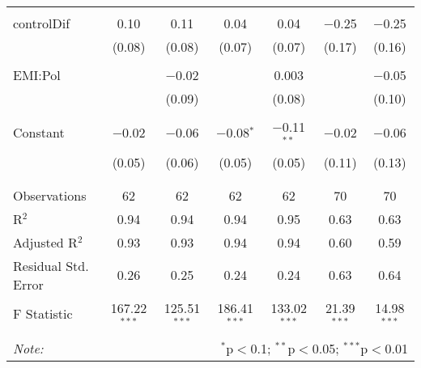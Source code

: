 \begin{table}[!htbp]
\begin{tabular}{@{\extracolsep{5pt}}lcccccc}
  & & & & & & \\ 
 controlDif & 0.10 & 0.11 & 0.04 & 0.04 & $-$0.25 & $-$0.25 \\ 
  & (0.08) & (0.08) & (0.07) & (0.07) & (0.17) & (0.16) \\ 
  & & & & & & \\ 
 EMI:Pol &  & $-$0.02 &  & 0.003 &  & $-$0.05 \\ 
  &  & (0.09) &  & (0.08) &  & (0.10) \\ 
  & & & & & & \\ 
 Constant & $-$0.02 & $-$0.06 & $-$0.08$^{*}$ & $-$0.11$^{**}$ & $-$0.02 & $-$0.06 \\ 
  & (0.05) & (0.06) & (0.05) & (0.05) & (0.11) & (0.13) \\ 
  & & & & & & \\ 
\hline \\[-1.8ex] 
Observations & 62 & 62 & 62 & 62 & 70 & 70 \\ 
R$^{2}$ & 0.94 & 0.94 & 0.94 & 0.95 & 0.63 & 0.63 \\ 
Adjusted R$^{2}$ & 0.93 & 0.93 & 0.94 & 0.94 & 0.60 & 0.59 \\ 
Residual Std. Error & 0.26 & 0.25 & 0.24 & 0.24 & 0.63 & 0.64 \\ 
F Statistic & 167.22$^{***}$ & 125.51$^{***}$ & 186.41$^{***}$ & 133.02$^{***}$ & 21.39$^{***}$ & 14.98$^{***}$ \\ 
\hline 
\hline \\[-1.8ex] 
\textit{Note:}  & \multicolumn{6}{r}{$^{*}$p$<$0.1; $^{**}$p$<$0.05; $^{***}$p$<$0.01} \\ 
\end{tabular} 
\end{table} 
